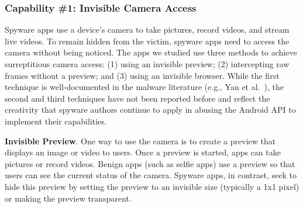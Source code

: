 \subsubsection*{Capability \#1: Invisible Camera Access}
\label{subsubsec:invisible_cam}
Spyware apps use a device's camera to take pictures, record videos, and stream live
videos. To remain hidden from the victim, spyware apps need to access the camera
without being noticed. The apps we studied use three methods to achieve
surreptitious camera access: (1) using an invisible preview; (2) intercepting raw
frames without a preview; and (3) using an invisible browser.
While the first technique is well-documented in the malware literature (e.g., Yan et al.~\cite{yan2019understanding}), the second and third techniques
have not been reported before and reflect
the creativity that spyware authors continue to apply in
abusing the Android API to implement their capabilities.




\textbf{Invisible Preview}. One way to use the camera is to create a preview that displays an image or video to users. Once a preview is started, apps can take pictures or record videos. Benign apps (such as selfie apps) use a preview so that users can see the current status of the camera. Spyware apps, in contrast, seek to hide this preview by setting the preview to an invisible size (typically a 1x1 pixel) or making the preview transparent.

